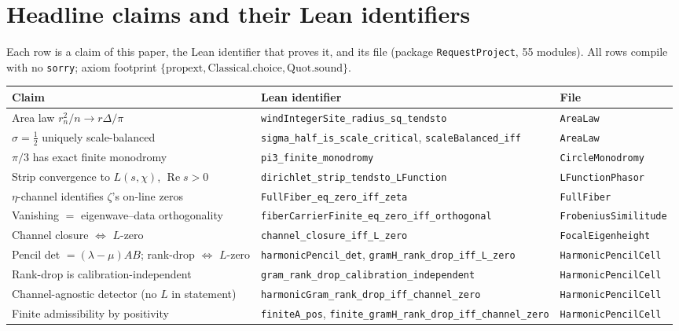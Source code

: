\documentclass[11pt]{article}
\DeclareMathOperator{\Ree}{Re}
\newcommand{\code}[1]{\texttt{#1}}
\begin{document}
\appendix

\section{Headline claims and their Lean identifiers}\label{app:claims}

Each row is a claim of this paper, the Lean identifier that proves it, and its file (package
\code{RequestProject}, 55 modules).  All rows compile with no \code{sorry}; axiom footprint
$\{\mathrm{propext},\mathrm{Classical.choice},\mathrm{Quot.sound}\}$.

\begingroup\small
\begin{longtable}{p{} p{} p{}}
\textbf{Claim} & \textbf{Lean identifier} & \textbf{File}\\
\hline
\endhead
Area law $r_n^2/n\to r\Delta/\pi$ & \code{windIntegerSite\_radius\_sq\_tendsto} & \code{AreaLaw}\\
$\sigma=\tfrac12$ uniquely scale-balanced & \code{sigma\_half\_is\_scale\_critical}, \code{scaleBalanced\_iff} & \code{AreaLaw}\\
$\pi/3$ has exact finite monodromy & \code{pi3\_finite\_monodromy} & \code{CircleMonodromy}\\
Strip convergence to $L(s,\chi)$, $\Ree s>0$ & \code{dirichlet\_strip\_tendsto\_LFunction} & \code{LFunctionPhasor}\\
$\eta$-channel identifies $\zeta$'s on-line zeros & \code{FullFiber\_eq\_zero\_iff\_zeta} & \code{FullFiber}\\
Vanishing $=$ eigenwave--data orthogonality & \code{fiberCarrierFinite\_eq\_zero\_iff\_orthogonal} & \code{FrobeniusSimilitude}\\
Channel closure $\iff$ $L$-zero & \code{channel\_closure\_iff\_L\_zero} & \code{FocalEigenheight}\\
Pencil det $=(\lambda-\mu)AB$; rank-drop $\iff$ $L$-zero & \code{harmonicPencil\_det}, \code{gramH\_rank\_drop\_iff\_L\_zero} & \code{HarmonicPencilCell}\\
Rank-drop is calibration-independent & \code{gram\_rank\_drop\_calibration\_independent} & \code{HarmonicPencilCell}\\
Channel-agnostic detector (no $L$ in statement) & \code{harmonicGram\_rank\_drop\_iff\_channel\_zero} & \code{HarmonicPencilCell}\\
Finite admissibility by positivity & \code{finiteA\_pos}, \code{finite\_gramH\_rank\_drop\_iff\_channel\_zero} & \code{HarmonicPencilCell}\\

\end{longtable}
\end{document}
